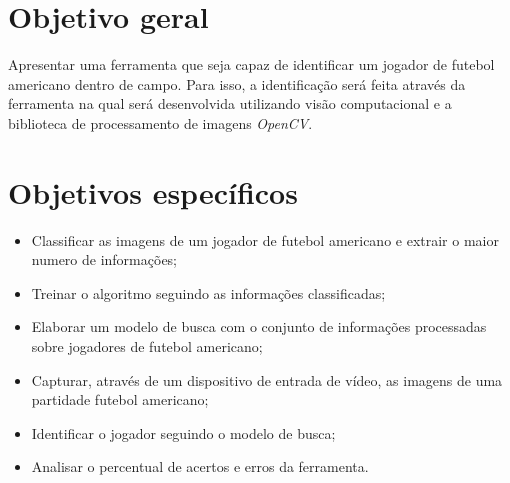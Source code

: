 \section{\textbf{{Objetivo geral}}}
\label{objetivo-geral}
Apresentar uma ferramenta que seja capaz de identificar um jogador de futebol americano dentro de campo. Para isso, a identificação será feita através da ferramenta na qual será desenvolvida utilizando visão computacional e a biblioteca de processamento de imagens \textit{OpenCV}. 


\section{\textbf{{Objetivos específicos}}}
 \begin{itemize}
\item Classificar as imagens de um jogador de futebol americano e extrair o maior numero de informações;

\item Treinar o algoritmo seguindo as informações classificadas;

\item Elaborar um modelo de busca com o conjunto de informações processadas sobre jogadores de futebol americano;
   
\item Capturar, através de um dispositivo de entrada de vídeo, as imagens de uma partidade futebol americano;
   
\item Identificar o jogador seguindo o modelo de busca;
   
\item Analisar o percentual de acertos e erros da ferramenta.
   
 \end{itemize}